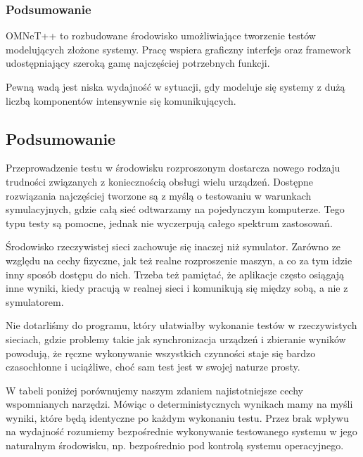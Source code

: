\documentclass[00-praca-magisterska.tex]{subfiles}
\begin{document}
\subsubsection{Podsumowanie}

OMNeT++ to rozbudowane środowisko umożliwiające tworzenie testów modelujących
złożone systemy. Pracę wspiera graficzny interfejs oraz framework
udostępniający szeroką gamę najczęściej potrzebnych funkcji.

Pewną wadą jest niska wydajność w sytuacji, gdy modeluje się systemy z dużą
liczbą komponentów intensywnie się komunikujących.

\subsection{Podsumowanie}
\label{weryfikacja-podsumowanie}

Przeprowadzenie testu w środowisku rozproszonym dostarcza nowego rodzaju
trudności związanych z koniecznością obsługi wielu urządzeń. Dostępne
rozwiązania najczęściej tworzone są z myślą o testowaniu w warunkach
symulacyjnych, gdzie całą sieć odtwarzamy na pojedynczym komputerze. Tego typu
testy są pomocne, jednak nie wyczerpują całego spektrum zastosowań.

Środowisko rzeczywistej sieci zachowuje się inaczej niż symulator. Zarówno ze
względu na cechy fizyczne, jak też realne rozproszenie maszyn, a co za tym
idzie inny sposób dostępu do nich. Trzeba też pamiętać, że aplikacje często
osiągają inne wyniki, kiedy pracują w realnej sieci i komunikują się między
sobą, a nie z symulatorem.

Nie dotarliśmy do programu, który ułatwiałby wykonanie testów w
rzeczywistych sieciach, gdzie problemy takie jak synchronizacja urządzeń i
zbieranie wyników powodują, że ręczne wykonywanie wszystkich czynności staje
się bardzo czasochłonne i uciążliwe, choć sam test jest w swojej naturze prosty.

W tabeli poniżej porównujemy naszym zdaniem najistotniejsze cechy wspomnianych
narzędzi. Mówiąc o deterministycznych wynikach mamy na myśli wyniki, które będą
identyczne po każdym wykonaniu testu. Przez brak wpływu na wydajność rozumiemy
bezpośrednie wykonywanie testowanego systemu w jego naturalnym środowisku, np.
bezpośrednio pod kontrolą systemu operacyjnego.
\end{document}
